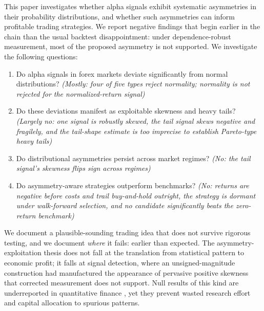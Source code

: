 \documentclass[11pt]{article}
\begin{document}
This paper investigates whether alpha signals exhibit systematic asymmetries in their probability distributions, and whether such asymmetries can inform profitable trading strategies. We report negative findings that begin earlier in the chain than the usual backtest disappointment: under dependence-robust measurement, most of the proposed asymmetry is not supported. We investigate the following questions:

\begin{enumerate}
    \item Do alpha signals in forex markets deviate significantly from normal distributions? \textit{(Mostly: four of five types reject normality; normality is not rejected for the normalized-return signal)}
    \item Do these deviations manifest as exploitable skewness and heavy tails? \textit{(Largely no: one signal is robustly skewed, the tail signal skews negative and fragilely, and the tail-shape estimate is too imprecise to establish Pareto-type heavy tails)}
    \item Do distributional asymmetries persist across market regimes? \textit{(No: the tail signal's skewness flips sign across regimes)}
    \item Do asymmetry-aware strategies outperform benchmarks? \textit{(No: returns are negative before costs and trail buy-and-hold outright, the strategy is dormant under walk-forward selection, and no candidate significantly beats the zero-return benchmark)}
\end{enumerate}

We document a plausible-sounding trading idea that does not survive rigorous testing, and we document \emph{where} it fails: earlier than expected. The asymmetry-exploitation thesis does not fall at the translation from statistical pattern to economic profit; it falls at signal detection, where an unsigned-magnitude construction had manufactured the appearance of pervasive positive skewness that corrected measurement does not support. Null results of this kind are underreported in quantitative finance \citep{harvey2017presidential}, yet they prevent wasted research effort and capital allocation to spurious patterns.
\end{document}

